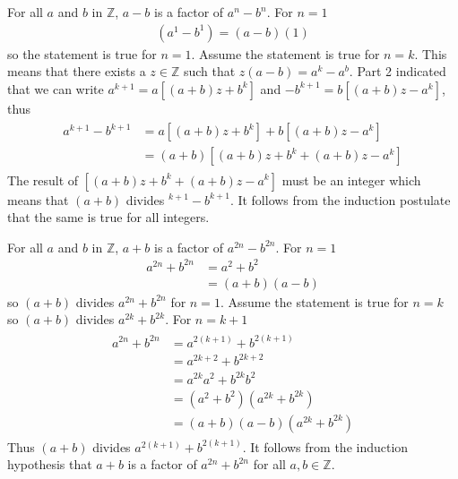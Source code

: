 \documentclass[paper=a4, fontsize=11pt]{jhwhw} %
\begin{document}
For all $a$ and $b$ in $\mathbb{Z}$, $a-b$ is a factor of $a^n-b^n$.
\solution
{}
For $n=1$
\begin{align}
\left(a^1-b^1\right) = \left(a-b\right)\left(1\right)
\end{align}
so the statement is true for $n=1$.
Assume the statement is true for $n=k$. This means that there exists a $z\in \mathbb Z$ such that $z\left(a-b\right) = a^k-a^b$.
Part 2 indicated that we can write $a^{k+1}=a[\left(a+b\right)z + b^k]$ and $-b^{k+1} = b[\left(a+b\right)z-a^k]$, thus
\begin{align}
\begin{split}
a^{k+1} - b^{k+1} &= a[\left(a+b\right)z + b^k] + b[\left(a+b\right)z-a^k]\\
&=\left(a+b\right)[\left(a+b\right)z + b^k + \left(a+b\right)z - a^k]
\end{split}
\end{align}
The result of $[\left(a+b\right)z + b^k + \left(a+b\right)z - a^k]$ must be an integer which means that $\left(a+b\right)$ divides $^{k+1} - b^{k+1}$. It follows from the induction postulate that the same is true for all integers.

For all $a$ and $b$ in $\mathbb Z$, $a+b$ is a factor of $a^{2n}-b^{2n}$.
\solution
{}
For $n=1$
\begin{align}
a^{2n} + b^{2n} &= a^2 + b^2\\
&=\left(a+b\right)\left(a-b\right)
\end{align}
so $\left(a+b\right)$ divides $a^{2n}+b^{2n}$ for $n=1$.
Assume the statement is true for $n=k$ so $\left(a+b\right)$ divides $a^{2k} + b^{2k}$.
For $n=k+1$
\begin{align}
\begin{split}
a^{2n} + b^{2n} &= a^{2\left(k+1\right)} + b^{2\left(k+1\right)}\\
&=a^{2k+2} + b^{2k+2}\\
&=a^{2k}a^2 + b^{2k}b^2\\
&=\left(a^2 + b^2\right)\left(a^{2k} + b^{2k}\right)\\
&=\left(a+b\right)\left(a-b\right)\left(a^{2k}+b^{2k}\right)
\end{split}
\end{align}
Thus $\left(a+b\right)$ divides $a^{2\left(k+1\right)} + b^{2\left(k+1\right)}$. It follows from the induction hypothesis that $a+b$ is a factor of $a^{2n} + b^{2n}$ for all $a,b\in \mathbb Z$.
\end{document}
